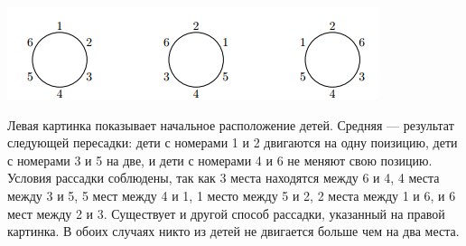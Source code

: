 \includegraphics{birthday.png}

Левая картинка показывает начальное расположение детей. Средняя --- результат следующей пересадки: дети с номерами 1 и 2 двигаются на одну поизицию, дети с номерами 3 и 5 на две, и дети с номерами 4 и 6 не меняют свою позицию. Условия рассадки соблюдены, так как 3 места находятся между 6 и 4, 4 места между 3 и 5, 5 мест между 4 и 1, 1 место между 5 и 2, 2 места между 1 и
6, и 6 мест между 2 и 3. Существует и другой способ рассадки, указанный на правой картинка. В обоих случаях никто из детей не двигается больше чем на два места.
